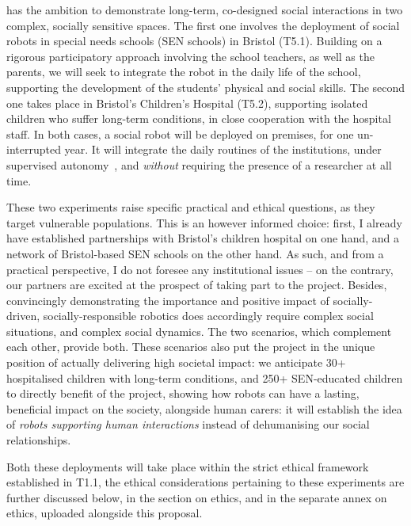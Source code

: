 \begin{rewrite}

\project has the ambition to demonstrate long-term, co-designed social
interactions in two complex, socially sensitive spaces.
The first one involves the deployment of social robots in special needs schools
(SEN schools) in Bristol (T5.1). Building on a rigorous participatory approach
involving the school teachers, as well as the parents, we will seek to integrate
the robot in the daily life of the school, supporting the development of the
students' physical and social skills. The second one takes place in Bristol's
Children's Hospital (T5.2), supporting isolated children who suffer long-term
conditions, in close cooperation with the hospital staff. In both cases, a
social robot will be deployed on premises, for one un-interrupted year. It will
integrate the daily routines of the institutions, under supervised
autonomy~\cite{senft2017supervised}, and \emph{without} requiring the
presence of a researcher at all time.

These two experiments raise specific practical and ethical questions, as they
target vulnerable populations. This is an however informed choice: first, I
already have established partnerships with Bristol's children hospital on one
hand, and a network of Bristol-based SEN schools on the other hand. As such, and
from a practical perspective, I do not foresee any institutional issues -- on
the contrary, our partners are excited at the prospect of taking part to the
project. Besides, convincingly demonstrating the importance and positive impact
of socially-driven, socially-responsible robotics does accordingly require
complex social situations, and complex social dynamics. The two scenarios, which
complement each other, provide both. These scenarios also put the project in the
unique position of actually delivering high societal impact: we anticipate 30+
hospitalised children with long-term conditions, and 250+ SEN-educated children
to directly benefit of the project, showing how robots can have a lasting,
beneficial impact on the society, alongside human carers: it will establish the
idea of \emph{robots supporting human interactions} instead of dehumanising our
social relationships.

Both these deployments will take place within the strict ethical framework
established in T1.1, the ethical considerations pertaining to these experiments
are further discussed below, in the section on ethics, and in the separate annex
on ethics, uploaded alongside this proposal.



\end{rewrite}
